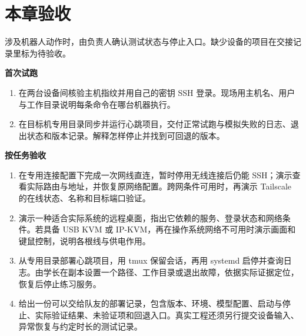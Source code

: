 \section{本章验收}
\label{sec:deploy-assessment}
涉及机器人动作时，由负责人确认测试状态与停止入口。缺少设备的项目在交接记录里标为待验收。

\textbf{首次试跑}
\begin{enumerate}
  \item 在两台设备间核验主机指纹并用自己的密钥 SSH 登录。现场用主机名、用户与工作目录说明每条命令在哪台机器执行。
  \item 在目标机专用目录同步并运行心跳项目，交付正常试跑与模拟失败的日志、退出状态和版本记录。解释怎样停止并找到可回退的版本。
\end{enumerate}

\textbf{按任务验收}
\begin{enumerate}
  \item 在专用连接配置下完成一次网线直连，暂时停用无线连接后仍能 SSH；演示查看实际路由与地址，并恢复原网络配置。跨网条件可用时，再演示 Tailscale 的在线状态、名称和目标端口验证。
  \item 演示一种适合实际系统的远程桌面，指出它依赖的服务、登录状态和网络条件。若具备 USB KVM 或 IP-KVM，再在操作系统网络不可用时演示画面和键鼠控制，说明各根线与供电作用。
  \item 从专用目录部署心跳项目，用 tmux 保留会话，再用 systemd 启停并查询日志。由学长在副本设置一个路径、工作目录或退出故障，依据实际证据定位，恢复后停止练习服务。
  \item 给出一份可以交给队友的部署记录，包含版本、环境、模型配置、启动与停止、实际验证结果、未验证项和回退入口。真实工程还须另行提交设备输入、异常恢复与约定时长的测试记录。
\end{enumerate}
\endgroup
